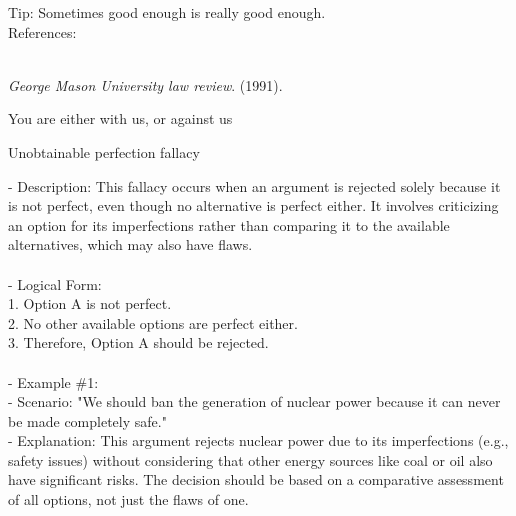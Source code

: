 \documentclass[a4paper,12pt,single,pdftex]{scrartcl}
\begin{document}
{    
      Tip: Sometimes good enough is really good enough.
    \\

    References:

    
      
        
      \\

      
        
          {\it George Mason University law review}. (1991).
        
      
    
  }


You are either with us, or against us

Unobtainable perfection fallacy
    
      - Description: This fallacy occurs when an argument is rejected solely because it is not perfect, even though no alternative is perfect either. It involves criticizing an option for its imperfections rather than comparing it to the available alternatives, which may also have flaws.
    \\

    
      
    \\

    
      - Logical Form:
    \\

    
        1. Option A is not perfect.
    \\

    
        2. No other available options are perfect either.
    \\

    
        3. Therefore, Option A should be rejected.
    \\

    
      
    \\

    
      - Example \#1:
    \\

    
        - Scenario: "We should ban the generation of nuclear power because it can never be made completely safe."
    \\

    
        - Explanation: This argument rejects nuclear power due to its imperfections (e.g., safety issues) without considering that other energy sources like coal or oil also have significant risks. The decision should be based on a comparative assessment of all options, not just the flaws of one.
    \\
\end{document}

